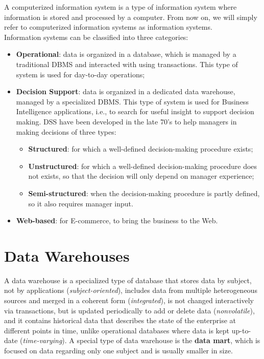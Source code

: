 A computerized information system is a type of information system where information is stored and processed by a computer. From now on, we will simply refer to computerized information systems as information systems. \\
Information systems can be classified into three categories:
\begin{itemize}
    \item \textbf{Operational}: data is organized in a database, which is managed by a traditional DBMS and interacted with using transactions. This type of system is used for day-to-day operations;
    \item \textbf{Decision Support}: data is organized in a dedicated data warehouse, managed by a specialized DBMS. This type of system is used for Business Intelligence applications, i.e., to search for useful insight to support decision making. DSS have been developed in the late 70's to help managers in making decisions of three types:
    \begin{itemize}
        \item \textbf{Structured}: for which a well-defined decision-making procedure exists;
        \item \textbf{Unstructured}: for which a well-defined decision-making procedure does not exists, so that the decision will only depend on manager experience;
        \item \textbf{Semi-structured}: when the decision-making procedure is partly defined, so it also requires manager input.
    \end{itemize}
    \item \textbf{Web-based}: for E-commerce, to bring the business to the Web.
\end{itemize}

\section{Data Warehouses}

A data warehouse is a specialized type of database that stores data by subject, not by applications (\textit{subject-oriented}), includes data from multiple heterogeneous sources and merged in a coherent form (\textit{integrated}), is not changed interactively via transactions, but is updated periodically to add or delete data (\textit{nonvolatile}), and it contains historical data that describes the state of the enterprise at different points in time, unlike operational databases where data is kept up-to-date (\textit{time-varying}). A special type of data warehouse is the \textbf{data mart}, which is focused on data regarding only one subject and is usually smaller in size.

